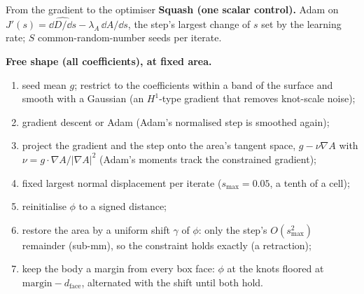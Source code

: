 \begin{frame}{From the gradient to the optimiser}
\textbf{Squash (one scalar control).}  Adam on
$J'(s) = \widehat{\dd D/\dd s} - \lambda_A\,\dd A/\dd s$, the step's largest change of $s$ set by
the learning rate; $S$ common-random-number seeds per iterate.

\medskip
\textbf{Free shape (all coefficients), at fixed area.}
\begin{enumerate}
\item seed mean $g$; restrict to the coefficients within a band of the surface and smooth with a
  Gaussian (an $H^1$-type gradient that removes knot-scale noise);
\item gradient descent or Adam (Adam's normalised step is smoothed again);
\item project the gradient and the step onto the area's tangent space,
  $g - \nu\nabla A$ with $\nu = g\cdot\nabla A/|\nabla A|^2$ (Adam's moments track the constrained gradient);
\item fixed largest normal displacement per iterate ($s_{\max} = 0.05$, a tenth of a cell);
\item reinitialise $\phi$ to a signed distance;
\item restore the area by a uniform shift $\gamma$ of $\phi$: only the step's $O(s_{\max}^2)$ remainder
  (sub-mm), so the constraint holds exactly (a retraction);
\item keep the body a margin from every box face: $\phi$ at the knots floored at
  $\text{margin} - d_{\text{face}}$, alternated with the shift until both hold.
\end{enumerate}
\end{frame}

